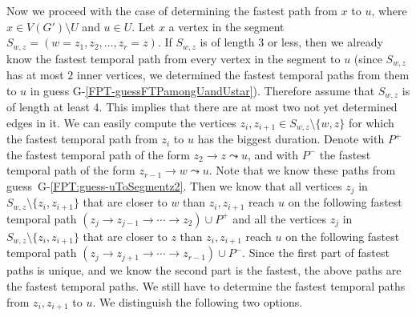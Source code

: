 \documentclass[a4paper,UKenglish,cleveref, autoref, thm-restate, anonymous]{lipics-v2021}
\begin{document}
Now we proceed with the case of determining the fastest path from $x$ to $u$, where $x \in V(G') \setminus U$ and $u \in U$.
Let $x$ a vertex in the segment $S_{w,z} = (w=z_1,z_2, \dots, z_r = z)$.
If $S_{w,z}$ is of length $3$ or less, then we already know the fastest temporal path from every vertex in the segment to $u$ 
(since $S_{w,z}$ has at most $2$ inner vertices, we determined the fastest temporal paths from them to $u$ in guess G-\ref{FPT-guessFTPamongUandUstar}).
Therefore assume that $S_{w,z}$ is of length at least $4$.
This implies that there are at most two not yet determined edges in it.
We can easily compute the vertices $z_i, z_{i+1} \in S_{w,z}\setminus\{w,z\}$ for which the fastest temporal path from $z_i$ to $u$ has the biggest duration.
Denote with $P^+$ the fastest temporal path of the form $z_2 \rightarrow z \leadsto u$,
and with $P^-$ the fastest temporal path of the form $z_{r-1} \rightarrow w \leadsto u$.
Note that we know these paths from guess~G-\ref{FPT:guess-uToSegmentz2}.
Then we know that all vertices $z_j$ in $S_{w,z} \setminus\{z_i,z_{i+1}\}$ that are closer to $w$ than $z_i,z_{i+1}$ reach $u$ on the 
following fastest temporal path $(z_j \rightarrow z_{j-1} \rightarrow \cdots \rightarrow z_2) \cup P^+$ 
and
all the vertices $z_j$ in $S_{w,z}\setminus\{z_i,z_{i+1}\}$ that are closer to $z$ than $z_i, z_{i+1}$ reach $u$ on the 
following fastest temporal path
$(z_j \rightarrow z_{j+1} \rightarrow \cdots \rightarrow z_{r-1}) \cup P^-$.
Since the first part of fastest paths is unique, and we know the second part is the fastest, the above paths are the fastest temporal paths.
We still have to determine the fastest temporal paths from $z_i,z_{i+1}$ to $u$.
We distinguish the following two options.
\end{document}
